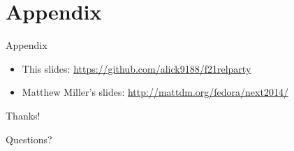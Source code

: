 \documentclass{beamer}
\begin{document}
\section*{Appendix}

\begin{frame}{Appendix}
  \begin{itemize}
    \item This slides: \url{https://github.com/alick9188/f21relparty}
    \item Matthew Miller's slides: \url{http://mattdm.org/fedora/next2014/}
  \end{itemize}
\end{frame}

\begin{frame}
  \begin{center}
    {\LARGE Thanks!
    \bigskip

    Questions?}

  \end{center}
\end{frame}
\end{document}
